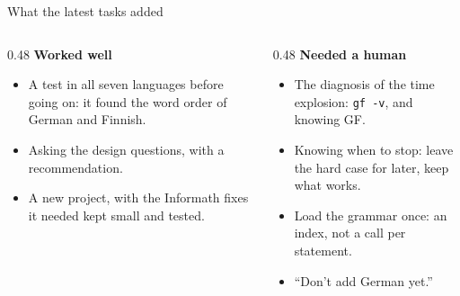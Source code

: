 \documentclass[10pt,aspectratio=169]{beamer}
\newcommand{\bad}[1]{\textcolor{warn}{#1}}
\newcommand{\ok}[1]{\textcolor{good}{#1}}
\begin{document}
\begin{frame}{What the latest tasks added}
  \begin{columns}[T]
    \begin{column}{0.48\textwidth}
      \ok{\textbf{Worked well}}
      \begin{itemize}\small
        \item A test in all seven languages before going on: it found the word order
              of German and Finnish.
        \item Asking the design questions, with a recommendation.
        \item A new project, with the Informath fixes it needed kept small and tested.
      \end{itemize}
    \end{column}
    \begin{column}{0.48\textwidth}
      \bad{\textbf{Needed a human}}
      \begin{itemize}\small
        \item The diagnosis of the time explosion: \texttt{gf -v}, and knowing GF.
        \item Knowing when to stop: leave the hard case for later, keep what works.
        \item Load the grammar once: an index, not a call per statement.
        \item ``Don't add German yet.''
      \end{itemize}
    \end{column}
  \end{columns}
\end{frame}
\end{document}
